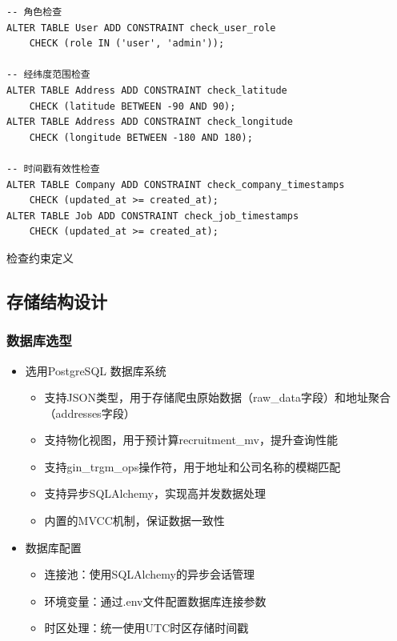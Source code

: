 \begin{listing}[htbp]
    \begin{verbatim}
-- 角色检查
ALTER TABLE User ADD CONSTRAINT check_user_role 
    CHECK (role IN ('user', 'admin'));

-- 经纬度范围检查
ALTER TABLE Address ADD CONSTRAINT check_latitude
    CHECK (latitude BETWEEN -90 AND 90);
ALTER TABLE Address ADD CONSTRAINT check_longitude
    CHECK (longitude BETWEEN -180 AND 180);

-- 时间戳有效性检查
ALTER TABLE Company ADD CONSTRAINT check_company_timestamps
    CHECK (updated_at >= created_at);
ALTER TABLE Job ADD CONSTRAINT check_job_timestamps
    CHECK (updated_at >= created_at);
    \end{verbatim}
    \caption{检查约束定义}\label{lst:check_constraints}
  \end{listing}

  \subsection{存储结构设计}

  \subsubsection{数据库选型}
  \begin{itemize}
    \item 选用PostgreSQL 数据库系统
    \begin{itemize}
      \item 支持JSON类型，用于存储爬虫原始数据（raw\_data字段）和地址聚合（addresses字段）
      \item 支持物化视图，用于预计算recruitment\_mv，提升查询性能
      \item 支持gin\_trgm\_ops操作符，用于地址和公司名称的模糊匹配
      \item 支持异步SQLAlchemy，实现高并发数据处理
      \item 内置的MVCC机制，保证数据一致性
    \end{itemize}
    \item 数据库配置
    \begin{itemize}
      \item 连接池：使用SQLAlchemy的异步会话管理
      \item 环境变量：通过.env文件配置数据库连接参数
      \item 时区处理：统一使用UTC时区存储时间戳
    \end{itemize}
  \end{itemize}
  

